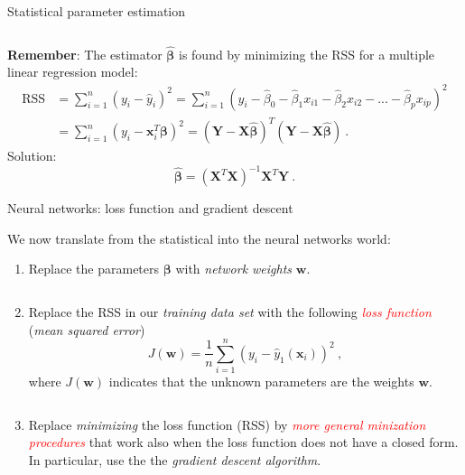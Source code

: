 \documentclass[10pt,ignorenonframetext,]{beamer}
\providecommand{\tightlist}{%
  \setlength{\itemsep}{0pt}\setlength{\parskip}{0pt}}
\begin{document}
\begin{frame}

\begin{block}{Statistical parameter estimation}

\(~\)

\textbf{Remember}: The estimator \(\hat{\boldsymbol \beta}\) is found by
minimizing the RSS for a multiple linear regression model: \[
\begin{aligned} \text{RSS} &=\sum_{i=1}^n (y_i - \hat y_i)^2 = \sum_{i=1}^n (y_i - \hat \beta_0 - \hat \beta_1 x_{i1} - \hat \beta_2 x_{i2} -...-\hat \beta_p x_{ip} )^2 \\
&= \sum_{i=1}^n (y_i-{\boldsymbol x}_i^T \boldsymbol \beta)^2=({\boldsymbol Y}-{\boldsymbol X}\hat{\boldsymbol{\beta}})^T({\boldsymbol Y}-{\boldsymbol X}\hat{\boldsymbol{\beta}}) \ .\end{aligned}
\] Solution:
\[ \hat{\boldsymbol\beta}=({\boldsymbol X}^T{\boldsymbol X})^{-1} {\boldsymbol X}^T {\boldsymbol Y} \ .\]

\end{block}

\end{frame}

\begin{frame}

\begin{block}{Neural networks: loss function and gradient descent}

\vspace{4mm}

We now translate from the statistical into the neural networks world:
\vspace{2mm}

\begin{enumerate}
\tightlist
\item
  Replace the parameters \(\boldsymbol\beta\) with \emph{network
  weights} \(\boldsymbol w\).
\end{enumerate}

\(~\)

\begin{enumerate}
\setcounter{enumi}{1}
\tightlist
\item
  Replace the RSS in our \emph{training data set} with the following
  \emph{\textcolor{red}{loss function}} (\emph{mean squared error})
  \[ J({\boldsymbol w})=\frac{1}{n}\sum_{i=1}^n (y_i-{\hat{y}_1({\boldsymbol x}_i)})^2 \ ,\]
  where \(J({\boldsymbol w})\) indicates that the unknown parameters are
  the weights \({\boldsymbol w}\).
\end{enumerate}

\(~\)

\begin{enumerate}
\setcounter{enumi}{2}
\tightlist
\item
  Replace \emph{minimizing} the loss function (RSS) by
  \emph{\textcolor{red}{more general minization procedures}} that work
  also when the loss function does not have a closed form. In
  particular, use the the \emph{gradient descent algorithm}.
\end{enumerate}

\end{block}

\end{frame}
\end{document}
